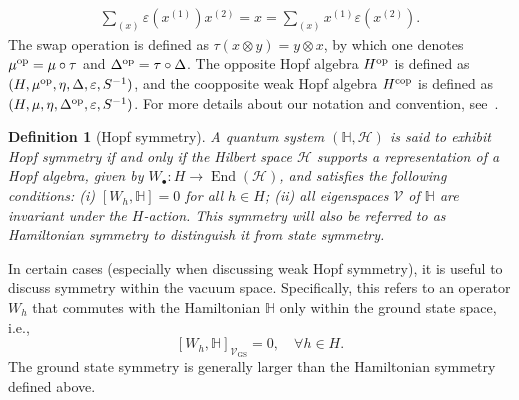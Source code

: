 \documentclass[a4paper,11pt]{article}
\theoremstyle{theorem}
\newtheorem{definition}{Definition}
\theoremstyle{remark}
\begin{document}
\begin{align}
    \sum_{(x)} \varepsilon(x^{(1)}) x^{(2)} = x = \sum_{(x)} x^{(1)} \varepsilon(x^{(2)}).
\end{align}
The swap operation is defined as $\tau(x \otimes y) = y \otimes x$, by which one denotes $\mu^{\rm op} = \mu \circ \tau$ and $\Delta^{\rm op} = \tau \circ \Delta$. The opposite Hopf algebra $H^{\rm op}$ is defined as $(H, \mu^{\rm op}, \eta, \Delta, \varepsilon, S^{-1})$, and the coopposite weak Hopf algebra $H^{\rm cop}$ is defined as $(H, \mu, \eta, \Delta^{\rm op}, \varepsilon, S^{-1})$. For more details about our notation and convention, see~\cite{jia2023boundary, Jia2023weak, jia2024generalized}.


\begin{definition}[Hopf symmetry]
    A quantum system \((\mathbb{H}, \mathcal{H})\) is said to exhibit Hopf symmetry if and only if the Hilbert space \(\mathcal{H}\) supports a representation of a Hopf algebra, given by \(W_{\bullet}: H \to \operatorname{End}(\mathcal{H})\), and satisfies the following conditions:  
    (i) \([W_h, \mathbb{H}] = 0\) for all \(h \in H\);  
    (ii) all eigenspaces \(\mathcal{V}\) of \(\mathbb{H}\) are invariant under the \(H\)-action.  
    This symmetry will also be referred to as Hamiltonian symmetry to distinguish it from state symmetry.
\end{definition}

In certain cases (especially when discussing weak Hopf symmetry), it is useful to discuss symmetry within the vacuum space. Specifically, this refers to an operator \(W_h\) that commutes with the Hamiltonian \(\mathbb{H}\) only within the ground state space, i.e.,  
\[
[W_h, \mathbb{H}]_{\mathcal{V}_{\mathrm{GS}}} = 0, \quad \forall h \in H.
\]  
The ground state symmetry is generally larger than the Hamiltonian symmetry defined above.
\end{document}
